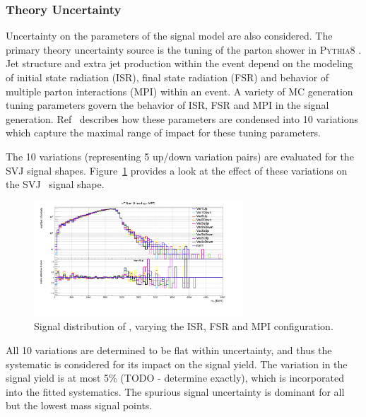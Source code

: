 \subsubsection{Theory Uncertainty}
Uncertainty on the parameters of the signal model are also considered. 
The primary theory uncertainty source is the tuning of the parton shower in \textsc{Pythia8} \cite{parton_shower}. 
Jet structure and extra jet production within the event depend on the modeling of initial state radiation (ISR), final state radiation (FSR) and behavior of multiple parton interactions (MPI) within an event.
A variety of MC generation tuning parameters govern the behavior of ISR, FSR and MPI in the signal generation.
Ref~\cite{pythia8_tunes} describes how these parameters are condensed into 10 variations which capture the maximal range of impact for these tuning parameters. 

The 10 variations (representing 5 up/down variation pairs) are evaluated for the SVJ signal shapes. 
Figure~\ref{fig:isrfsr} provides a look at the effect of these variations on the SVJ \mt~signal shape. 

\begin{figure}[!htbp]
\centering
   \includegraphics[width=0.7\textwidth]{figures/systs/isrfsr}
    \caption{Signal distribution of \mt, varying the ISR, FSR and MPI configuration.
    \label{fig:isrfsr}}
\end{figure}

All 10 variations are determined to be flat within uncertainty, and thus the systematic is considered for its impact on the signal yield.
The variation in the signal yield is at most 5\% (TODO - determine exactly), which is incorporated into the fitted systematics. 
The spurious signal uncertainty is dominant for all but the lowest mass signal points.

